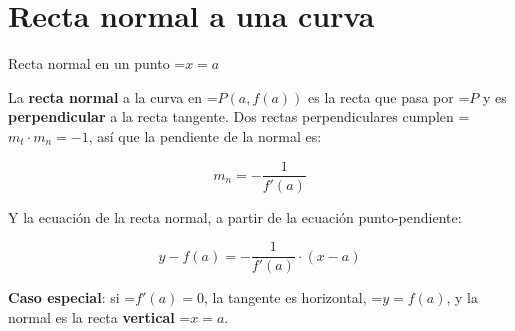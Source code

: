 \documentclass[11pt,a4paper]{article}
\newcommand{\fmm}[1]{\setbox0=\hbox{$#1$}\ifdim\wd0>\linewidth\[#1\]\else\mbox{\box0}\fi}
\newcommand{\fmuline}[1]{\textbf{\color{fmaccent}#1}}
\begin{document}
  
\section{Recta normal a una curva}\hypertarget{sec2}{}

  

  
\begin{fmdef}{Recta normal en un punto \fmm{x=a}}
\par\noindent \begin{minipage}[t]{0.48\linewidth}\vspace{0pt}\raggedright La \textbf{recta normal} a la curva en \fmm{P(a,f(a))} es la recta que pasa por \fmm{P} y es \textbf{perpendicular} a la recta tangente. Dos rectas perpendiculares cumplen \fmm{m_t\cdot m_n=-1}, así que la pendiente de la normal es:

          
\[m_n=-\frac{1}{f'(a)}\]

          

Y la ecuación de la recta normal, a partir de la ecuación punto-pendiente:

          
\[y-f(a)=-\frac{1}{f'(a)}\cdot(x-a)\]
\end{minipage}\hfill\begin{minipage}[t]{0.48\linewidth}\vspace{0pt}\raggedright \begin{center}\end{center}\end{minipage}\par\medskip

      
\begin{fmnote}\fmuline{Caso especial}: si \fmm{f'(a)=0}, la tangente es horizontal, \fmm{y=f(a)}, y la normal es la recta \textbf{vertical} \fmm{x=a}.\end{fmnote}
\end{fmdef}
\end{document}
